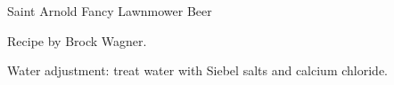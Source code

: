 \begin{recipe}{Saint Arnold Fancy Lawnmower Beer}

\begin{aboutblock}
Recipe by Brock Wagner. 
\end{aboutblock}


\begin{methodandtiming}

\begin{mashsteps}
\end{mashsteps}

\begin{fermentationsteps}
\end{fermentationsteps}

\begin{directions}
Water adjustment: treat water with Siebel salts and calcium chloride.
\end{directions}

\end{methodandtiming}

\recipebreak

\begin{ingredientsblock}

\begin{malts}
\end{malts}

\begin{hops}
\end{hops}


\end{ingredientsblock}

\end{recipe}


